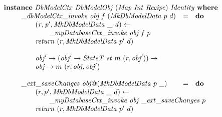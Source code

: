 \begin{displaymath}
\begin{array}{l}
\mathbf{instance}~\mathit{DbModelCtx}~\mathit{DbModelObj}~(\mathit{Map}~\mathit{Int}~\mathit{Recipe})~\mathit{Identity}~\mathbf{where}\\
\qquad \begin{array}{lcl}
\mathit{\_\mathit{dbModelCtx\_invoke}}~\mathit{obj}~\mathit{f}~(\mathit{MkDbModelData}~p~d) & = & \mathbf{do} \\
\multicolumn{3}{l}{\qquad \mathit{(r,p',\mathit{MkDbModelData}~\_~d) \leftarrow}}\\
\multicolumn{3}{l}{\qquad \qquad \mathit{\_myDatabaseCtx\_invoke}~\mathit{obj}~\mathit{f}~p} \\
\multicolumn{3}{l}{\qquad \mathit{return}~(r,\mathit{MkDbModelData}~p'~d)} \\\\
\multicolumn{3}{l}{\qquad \mathit{obj}' \to (\mathit{obj}' \to \mathit{StateT}~\mathit{st}~m~(r,\mathit{obj}')) \to} \\
\multicolumn{3}{l}{\qquad \mathit{obj} \to m~(r,\mathit{obj},\mathit{obj}')} \\\\

\mathit{\_ext\_saveChanges}~\mathit{obj}@(\mathit{MkDbModelData}~p~\_) & = & \mathbf{do} \\
\multicolumn{3}{l}{\qquad (r,p',\mathit{MkDbModelData}~\_~d) \leftarrow} \\
\multicolumn{3}{l}{\qquad \qquad \mathit{\_myDatabaseCtx\_invoke}~\mathit{obj}~\mathit{\_ext\_saveChanges}~p} \\
\multicolumn{3}{l}{\qquad \mathit{return}~(r,\mathit{MkDbModelData}~p'~d)}
\end{array}
\end{array}
\end{displaymath}